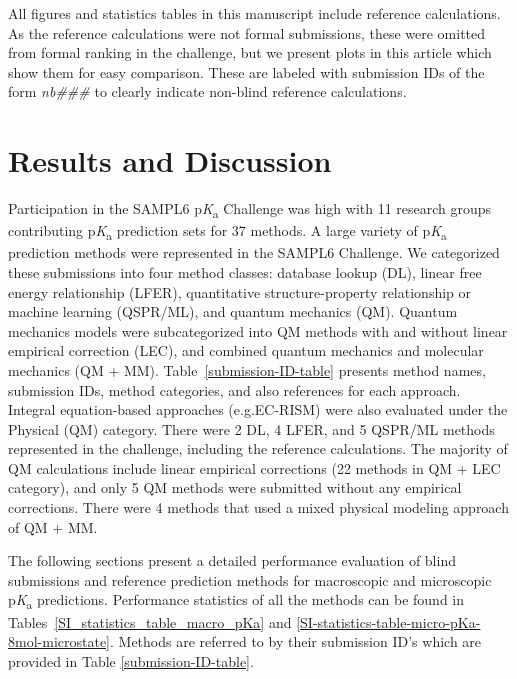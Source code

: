 \documentclass[9pt,lineno,final]{elife}
\newcommand{\pKa}{p\textit{K}\textsubscript{a}}
\begin{document}
All figures and statistics tables in this manuscript include reference calculations. 
As the reference calculations were not formal submissions, these were omitted from formal ranking in the challenge, but we present plots in this article which show them for easy comparison. 
These are labeled with submission IDs of the form \textit{nb\#\#\#} to clearly indicate non-blind reference calculations.


\section{Results and Discussion}


Participation in the SAMPL6 \pKa{} Challenge was high with 11 research groups contributing \pKa{} prediction sets for 37 methods.  
A large variety of \pKa{} prediction methods were represented in the SAMPL6 Challenge. 
We categorized these submissions into four method classes: database lookup (DL), linear free energy relationship (LFER), quantitative structure-property relationship or machine learning (QSPR/ML), and quantum mechanics (QM). 
Quantum mechanics models were subcategorized into QM methods with and without linear empirical correction (LEC), and combined quantum mechanics and molecular mechanics (QM + MM). 
Table~\ref{submission-ID-table} presents method names, submission IDs, method categories, and also references for each approach. 
Integral equation-based approaches (e.g.EC-RISM) were also evaluated under the Physical (QM) category. 
There were 2 DL, 4 LFER, and 5 QSPR/ML methods represented in the challenge, including the reference calculations. 
The majority of QM calculations include linear empirical corrections (22 methods in QM + LEC category), and only 5 QM methods were submitted without any empirical corrections. 
There were 4 methods that used a mixed physical modeling approach of QM + MM. 

The following sections present a detailed performance evaluation of blind submissions and reference prediction methods for macroscopic and microscopic \pKa{} predictions. 
Performance statistics of all the methods can be found in Tables~\ref{SI_statistics_table_macro_pKa} and \ref{SI-statistics-table-micro-pKa-8mol-microstate}. 
Methods are referred to by their submission ID's which are provided in Table \ref{submission-ID-table}.
\end{document}
